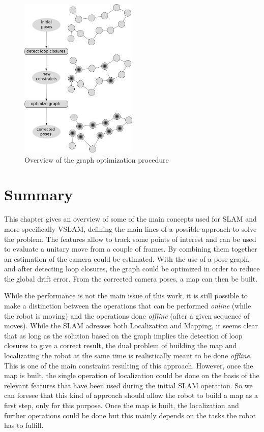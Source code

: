 \begin{figure}[H]
\centering
\includegraphics[width=0.5\textwidth]{figures/graph1}
\caption{Overview of the graph optimization procedure}
\end{figure}

\section{Summary}

This chapter gives an overview of some of the main concepts used for \gls{SLAM} and more specifically \gls{VSLAM}, defining the main lines of a possible approach to solve the problem. The features allow to track some points of interest and can be used to evaluate a unitary move from a couple of frames. By combining them together an estimation of the camera could be estimated. With the use of a pose graph, and after detecting loop closures, the graph could be optimized in order to reduce the global drift error. From the corrected camera poses, a map can then be built. 

While the performance is not the main issue of this work, it is still possible to make a distinction between the operations that can be performed \emph{online} (while the robot is moving) and the operations done \emph{offline} (after a given sequence of moves). While the \gls{SLAM} adresses both Localization and Mapping, it seems clear that as long as the solution based on the graph implies the detection of loop closures to give a correct result, the dual problem of building the map and localizating the robot at the same time is realistically meant to be done \emph{offline}. This is one of the main constraint resulting of this approach. However, once the map is built, the single operation of localization could be done on the basis of the relevant features that have been used during the initial \gls{SLAM} operation. So we can foresee that this kind of approach should allow the robot to build a map as a first step, only for this purpose. Once the map is built, the localization and further operations could be done but this mainly depends on the tasks the robot has to fulfill.

